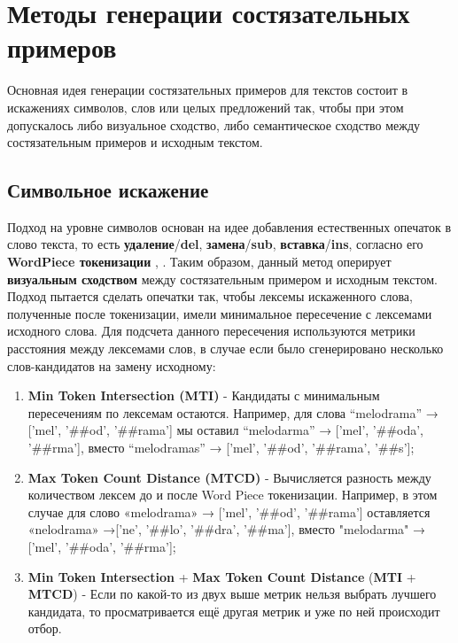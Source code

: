 \section{Методы генерации состязательных примеров}
\label{sec:AdversarialGen} 

\noindent\hspace{0.6cm}Основная идея генерации состязательных примеров для текстов состоит в искажениях символов, слов или целых предложений так, чтобы при этом допускалось либо визуальное сходство, либо семантическое сходство между состязательным примеров и исходным текстом.

\subsection{Символьное искажение}
\label{sec:AdvSymbol}

\noindent\hspace{0.6cm}Подход на уровне символов основан на идее добавления естественных опечаток в слово текста, то есть \textbf{удаление}/\textbf{del}, \textbf{замена}/\textbf{sub}, \textbf{вставка}/\textbf{ins}, согласно его \textbf{WordPiece токенизации} \cite{adversarialgenerating1}, \cite{adversarialgenerating3}. Таким образом, данный метод оперирует \textbf{визуальным сходством} между состязательным примером и исходным текстом. Подход пытается сделать опечатки так, чтобы лексемы искаженного слова, полученные после токенизации, имели минимальное пересечение с лексемами исходного слова. Для подсчета данного пересечения используются метрики расстояния между лексемами слов, в случае если было сгенерировано несколько слов-кандидатов на замену исходному:

\begin{enumerate}
    \item \textbf{Min Token Intersection (MTI)} - Кандидаты с минимальным пересечениям по лексемам остаются. Например, для слова “melodrama” → [’mel’, ’\#\#od’, ’\#\#rama’] мы оставил “melodarma” → [’mel’, ’\#\#oda’, ’\#\#rma’], вместо “melodramas” → [’mel’, ’\#\#od’, ’\#\#rama’, ’\#\#s’];
    \item \textbf{Max Token Count Distance (MTCD)} - Вычисляется разность между количеством лексем до и после Word Piece токенизации. Например, в этом случае для слово «melodrama» → ['mel', '\#\#od', '\#\#rama'] оставляется «nelodrama» →['ne', '\#\#lo', '\#\#dra', '\#\#ma'], вместо "melodarma" → ['mel', '\#\#oda', '\#\#rma'];
    \item \textbf{Min Token Intersection} + \textbf{Max Token Count Distance} (\textbf{MTI} + \textbf{MTCD}) - Если по какой-то из двух выше метрик нельзя выбрать лучшего кандидата, то просматривается ещё другая метрик и уже по ней происходит отбор.
\end{enumerate}

